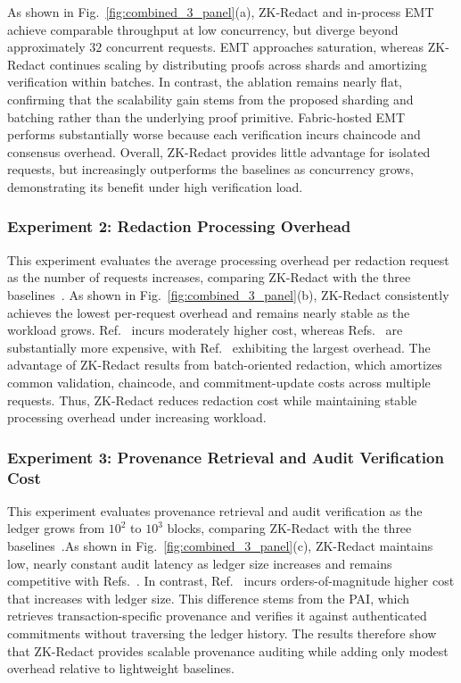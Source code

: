 \documentclass[lettersize,journal]{IEEEtran}
\begin{document}
As shown in Fig.~\ref{fig:combined_3_panel}(a), ZK-Redact and in-process
EMT achieve comparable throughput at low concurrency, but diverge beyond
approximately $32$ concurrent requests. EMT approaches saturation, whereas
ZK-Redact continues scaling by distributing proofs across shards and
amortizing verification within batches. In contrast, the ablation remains
nearly flat, confirming that the scalability gain stems from the proposed
sharding and batching rather than the underlying proof primitive.
Fabric-hosted EMT performs substantially worse because each verification
incurs chaincode and consensus overhead. Overall, ZK-Redact provides little
advantage for isolated requests, but increasingly outperforms the baselines
as concurrency grows, demonstrating its benefit under high verification
load.
\subsubsection*{\textbf{Experiment 2: Redaction Processing Overhead}}
\label{exp:redaction-overhead}

This experiment evaluates the average processing overhead per redaction
request as the number of requests increases, comparing ZK-Redact with
the three baselines~\cite{ref10,ref13,ref22}. As shown in Fig.~\ref{fig:combined_3_panel}(b), ZK-Redact consistently
achieves the lowest per-request overhead and remains nearly stable as the
workload grows. Ref.~\cite{ref10} incurs moderately higher cost, whereas
Refs.~\cite{ref13,ref22} are substantially more expensive, with
Ref.~\cite{ref22} exhibiting the largest overhead. The advantage of
ZK-Redact results from batch-oriented redaction, which amortizes common
validation, chaincode, and commitment-update costs across multiple
requests. Thus, ZK-Redact reduces redaction cost while maintaining stable
processing overhead under increasing workload.

\subsubsection*{\textbf{Experiment 3: Provenance Retrieval and Audit Verification Cost}}
\label{exp:provenance-audit}

This experiment evaluates provenance retrieval and audit verification as
the ledger grows from $10^2$ to $10^3$ blocks, comparing ZK-Redact with
the three baselines~\cite{ref10,ref13,ref22}.As shown in Fig.~\ref{fig:combined_3_panel}(c), ZK-Redact maintains low,
nearly constant audit latency as ledger size increases and remains
competitive with Refs.~\cite{ref10,ref13}. In contrast,
Ref.~\cite{ref22} incurs orders-of-magnitude higher cost that increases
with ledger size. This difference stems from the PAI, which retrieves
transaction-specific provenance and verifies it against authenticated
commitments without traversing the ledger history. The results therefore
show that ZK-Redact provides scalable provenance auditing while adding
only modest overhead relative to lightweight baselines.
\end{document}
